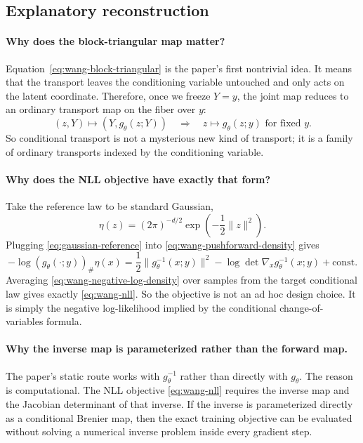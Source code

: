 \documentclass[11pt]{report}
\newcommand{\pushf}[2]{\left(#1\right)_{\#} #2}
\begin{document}
\subsection*{Explanatory reconstruction}

\paragraph{Why does the block-triangular map matter?}
Equation~\eqref{eq:wang-block-triangular} is the paper's first nontrivial idea.
It means that the transport leaves the conditioning variable untouched and only
acts on the latent coordinate.  Therefore, once we freeze $Y=y$, the joint map
reduces to an ordinary transport map on the fiber over $y$:
\begin{equation}
(z,Y)\mapsto (Y,g_\theta(z;Y))
\quad\Longrightarrow\quad
z\mapsto g_\theta(z;y)
\text{ for fixed } y.
\label{eq:wang-fiberwise-reduction}
\end{equation}
So conditional transport is not a mysterious new kind of transport; it is a
family of ordinary transports indexed by the conditioning variable.

\paragraph{Why does the NLL objective have exactly that form?}
Take the reference law to be standard Gaussian,
\begin{equation}
\eta(z) = (2\pi)^{-d/2}\exp\!\left(-\frac12\|z\|^2\right).
\label{eq:gaussian-reference}
\end{equation}
Plugging \eqref{eq:gaussian-reference} into
\eqref{eq:wang-pushforward-density} gives
\begin{equation}
-\log \pushf{g_\theta(\cdot;y)}{\eta}(x)
=
\frac12\|g_\theta^{-1}(x;y)\|^2
-\log\det \nabla_x g_\theta^{-1}(x;y)
+\text{const}.
\label{eq:wang-negative-log-density}
\end{equation}
Averaging \eqref{eq:wang-negative-log-density} over samples from the target
conditional law gives exactly \eqref{eq:wang-nll}.  So the objective is not an ad
hoc design choice.  It is simply the negative log-likelihood implied by the
conditional change-of-variables formula.

\paragraph{Why the inverse map is parameterized rather than the forward map.}
The paper's static route works with $g_\theta^{-1}$ rather than directly with
$g_\theta$.  The reason is computational.  The NLL objective
\eqref{eq:wang-nll} requires the inverse map and the Jacobian determinant of that
inverse.  If the inverse is parameterized directly as a conditional Brenier map,
then the exact training objective can be evaluated without solving a numerical
inverse problem inside every gradient step.
\end{document}
